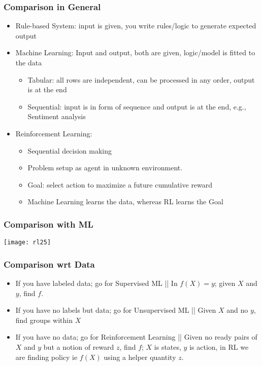 \begin{frame}[fragile]\frametitle{Comparison in General}

\begin{itemize}
\item Rule-based System: input is given, you write rules/logic to generate expected output
\item Machine Learning: Input and output, both are given, logic/model is fitted to the data
	\begin{itemize}
	\item Tabular: all rows are independent, can be processed in any order, output is at the end
	\item Sequential: input is in form of sequence and output is at the end, e.g., Sentiment analysis
	\end{itemize}
\item Reinforcement Learning: 
	\begin{itemize}
	\item Sequential decision making 
	\item Problem setup as agent in unknown environment. 
	\item Goal: select action to maximize a future cumulative reward
	\item Machine Learning learns the data, whereas RL learns the Goal
	\end{itemize}
\end{itemize}

\end{frame}

\begin{frame}[fragile]\frametitle{Comparison with ML}
\begin{center}
\texttt{[image: rl25]}
\end{center}
\end{frame}

\begin{frame}[fragile]\frametitle{Comparison wrt Data}

\begin{itemize}
\item If you have labeled data; go for Supervised ML || In $f(X) = y$; given $X$ and $y$,  find $f$.
\item If you have no labels but data; go for Unsupervised ML || Given $X$ and no $y$,  find groups within $X$
\item If you have no data; go for Reinforcement Learning || Given no ready pairs of $X$ and $y$ but a notion of reward $z$, find $f$; $X$ is states, $y$ is action, in RL we are finding policy ie $f(X)$ using a helper quantity $z$.
\end{itemize}


\end{frame}


